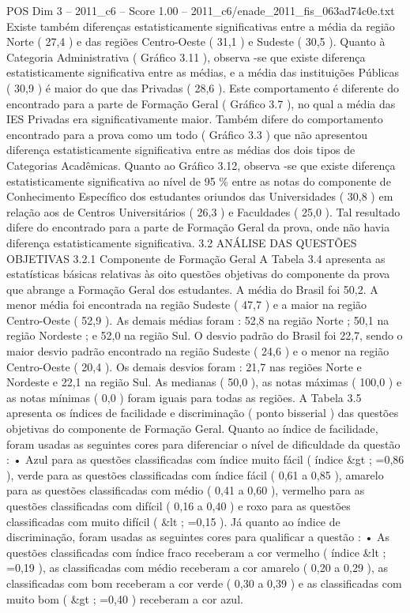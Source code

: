 \begin{textsample}{POS Dim 3 – 2011\_c6 – Score 1.00 – 2011\_c6/enade\_2011\_fis\_063ad74c0e.txt}
Existe também diferenças estatisticamente significativas entre a média da região Norte ( 27,4 ) e das regiões Centro-Oeste ( 31,1 ) e Sudeste ( 30,5 ).
Quanto à Categoria Administrativa ( Gráfico 3.11 ), observa -se que existe diferença estatisticamente significativa entre as médias, e a média das instituições Públicas ( 30,9 ) é maior do que das Privadas ( 28,6 ).
Este comportamento é diferente do encontrado para a parte de Formação Geral ( Gráfico 3.7 ), no qual a média das IES Privadas era significativamente maior.
Também difere do comportamento encontrado para a prova como um todo ( Gráfico 3.3 ) que não apresentou diferença estatisticamente significativa entre as médias dos dois tipos de Categorias Acadêmicas.
Quanto ao Gráfico 3.12, observa -se que existe diferença estatisticamente significativa ao nível de 95 \% entre as notas do componente de Conhecimento Específico dos estudantes oriundos das Universidades ( 30,8 ) em relação aos de Centros Universitários ( 26,3 ) e Faculdades ( 25,0 ).
Tal resultado difere do encontrado para a parte de Formação Geral da prova, onde não havia diferença estatisticamente significativa. 3.2 ANÁLISE DAS QUESTÕES OBJETIVAS 3.2.1 Componente de Formação Geral A Tabela 3.4 apresenta as estatísticas básicas relativas às oito questões objetivas do componente da prova que abrange a Formação Geral dos estudantes.
A média do Brasil foi 50,2.
A menor média foi encontrada na região Sudeste ( 47,7 ) e a maior na região Centro-Oeste ( 52,9 ).
As demais médias foram : 52,8 na região Norte ; 50,1 na região Nordeste ; e 52,0 na região Sul.
O desvio padrão do Brasil foi 22,7, sendo o maior desvio padrão encontrado na região Sudeste ( 24,6 ) e o menor na região Centro-Oeste ( 20,4 ).
Os demais desvios foram : 21,7 nas regiões Norte e Nordeste e 22,1 na região Sul.
As medianas ( 50,0 ), as notas máximas ( 100,0 ) e as notas mínimas ( 0,0 ) foram iguais para todas as regiões.
A Tabela 3.5 apresenta os índices de facilidade e discriminação ( ponto bisserial ) das questões objetivas do componente de Formação Geral.
Quanto ao índice de facilidade, foram usadas as seguintes cores para diferenciar o nível de dificuldade da questão : • Azul para as questões classificadas com índice muito fácil ( índice \&gt ; =0,86 ), verde para as questões classificadas com índice fácil ( 0,61 a 0,85 ), amarelo para as questões classificadas com médio ( 0,41 a 0,60 ), vermelho para as questões classificadas com difícil ( 0,16 a 0,40 ) e roxo para as questões classificadas com muito difícil ( \&lt ; =0,15 ).
Já quanto ao índice de discriminação, foram usadas as seguintes cores para qualificar a questão : • As questões classificadas com índice fraco receberam a cor vermelho ( índice \&lt ; =0,19 ), as classificadas com médio receberam a cor amarelo ( 0,20 a 0,29 ), as classificadas com bom receberam a cor verde ( 0,30 a 0,39 ) e as classificadas com muito bom ( \&gt ; =0,40 ) receberam a cor azul.

\end{textsample}
